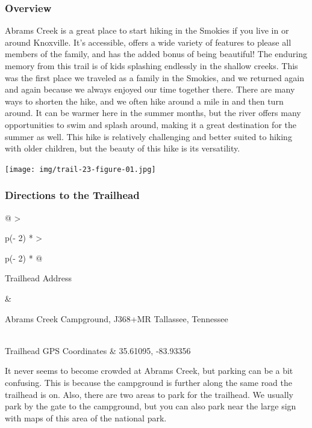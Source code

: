 \documentclass[
  letterpaper,
  DIV=11,
  numbers=noendperiod]{scrartcl}
\begin{document}
\hypertarget{overview-24}{%
\subsubsection{Overview}\label{overview-24}}

Abrams Creek is a great place to start hiking in the Smokies if you live
in or around Knoxville. It's accessible, offers a wide variety of
features to please all members of the family, and has the added bonus of
being beautiful! The enduring memory from this trail is of kids
splashing endlessly in the shallow creeks. This was the first place we
traveled as a family in the Smokies, and we returned again and again
because we always enjoyed our time together there. There are many ways
to shorten the hike, and we often hike around a mile in and then turn
around. It can be warmer here in the summer months, but the river offers
many opportunities to swim and splash around, making it a great
destination for the summer as well. This hike is relatively challenging
and better suited to hiking with older children, but the beauty of this
hike is its versatility.

\texttt{[image: img/trail-23-figure-01.jpg]}

\hypertarget{directions-to-the-trailhead-24}{%
\subsubsection{Directions to the
Trailhead}\label{directions-to-the-trailhead-24}}

\begin{longtable}[]{@{}
  >{\raggedright\arraybackslash}p{(\columnwidth - 2\tabcolsep) * }
  >{\raggedright\arraybackslash}p{(\columnwidth - 2\tabcolsep) * }@{}}
\toprule\noalign{}
\begin{minipage}[b]{\linewidth}\raggedright
Trailhead Address
\end{minipage} & \begin{minipage}[b]{\linewidth}\raggedright
Abrams Creek Campground, J368+MR Tallassee, Tennessee
\end{minipage} \\
\midrule\noalign{}
\endhead
\bottomrule\noalign{}
\endlastfoot
Trailhead GPS Coordinates & 35.61095, -83.93356 \\
\end{longtable}

It never seems to become crowded at Abrams Creek, but parking can be a
bit confusing. This is because the campground is further along the same
road the trailhead is on. Also, there are two areas to park for the
trailhead. We usually park by the gate to the campground, but you can
also park near the large sign with maps of this area of the national
park.
\end{document}
